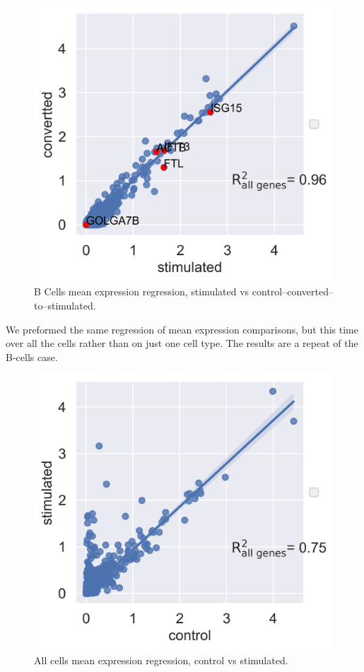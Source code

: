 \documentclass[11pt, a4paper]{report}
\theoremstyle{plain}
\theoremstyle{definition}
\theoremstyle{remark}
\begin{document}
\begin{figure}[h]
\centering
\includegraphics[width=1.1\textwidth]{images/Kang_bcells_stimulated_converted.png}
\caption{
B Cells mean expression regression, stimulated vs
control--converted--to--stimulated.
}
\label{fig:Kang_bcells_stimulated_converted}
\end{figure}

We preformed the same regression of mean expression comparisons, but this time
over all the cells rather than on just one cell type. The results are a repeat
of the B-cells case.

\begin{figure}[h]
\centering
\includegraphics[width=1.1\textwidth]{images/Kang_allcells_ctrl_stim.png}
\caption{
All cells mean expression regression, control vs stimulated.
}
\label{fig:Kang_allcells_ctrl_stim}
\end{figure}
\end{document}
